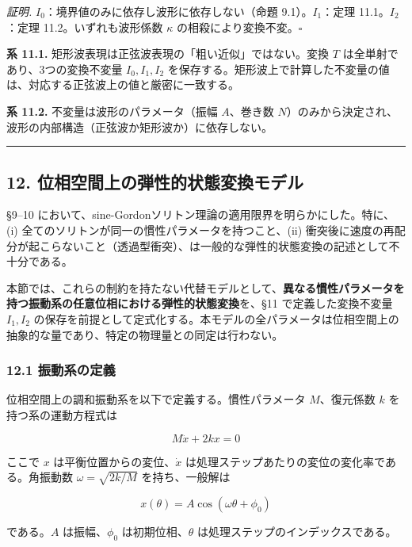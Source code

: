 \documentclass[a4paper,11pt]{ltjsarticle}
\begin{document}
\emph{証明.} \(I_0\)：境界値のみに依存し波形に依存しない（命題
9.1）。\(I_1\)：定理 11.1。\(I_2\)：定理 11.2。いずれも波形係数
\(\kappa\) の相殺により変換不変。\(\square\)

\textbf{系 11.1.} 矩形波表現は正弦波表現の「粗い近似」ではない。変換
\(T\) は全単射であり、3つの変換不変量 \(I_0, I_1, I_2\)
を保存する。矩形波上で計算した不変量の値は、対応する正弦波上の値と厳密に一致する。

\textbf{系 11.2.} 不変量は波形のパラメータ（振幅 \(A\)、巻き数
\(N\)）のみから決定され、波形の内部構造（正弦波か矩形波か）に依存しない。

\begin{center}\rule{0.5\linewidth}{0.5pt}\end{center}

\subsection{12.
位相空間上の弾性的状態変換モデル}\label{ux4f4dux76f8ux7a7aux9593ux4e0aux306eux5f3eux6027ux7684ux72b6ux614bux5909ux63dbux30e2ux30c7ux30eb}

§9--10
において、sine-Gordonソリトン理論の適用限界を明らかにした。特に、(i)
全てのソリトンが同一の慣性パラメータを持つこと、(ii)
衝突後に速度の再配分が起こらないこと（透過型衝突）、は一般的な弾性的状態変換の記述として不十分である。

本節では、これらの制約を持たない代替モデルとして、\textbf{異なる慣性パラメータを持つ振動系の任意位相における弾性的状態変換}を、§11
で定義した変換不変量 \(I_1, I_2\)
の保存を前提として定式化する。本モデルの全パラメータは位相空間上の抽象的な量であり、特定の物理量との同定は行わない。

\subsubsection{12.1
振動系の定義}\label{ux632fux52d5ux7cfbux306eux5b9aux7fa9}

位相空間上の調和振動系を以下で定義する。慣性パラメータ \(M\)、復元係数
\(k\) を持つ系の運動方程式は

\[M\ddot{x} + 2kx = 0 \tag{W12}\]

ここで \(x\) は平衡位置からの変位、\(\dot{x}\)
は処理ステップあたりの変位の変化率である。角振動数
\(\omega = \sqrt{2k/M}\) を持ち、一般解は

\[x(\theta) = A\cos(\omega\theta + \phi_0) \tag{W13}\]

である。\(A\) は振幅、\(\phi_0\) は初期位相、\(\theta\)
は処理ステップのインデックスである。
\end{document}
